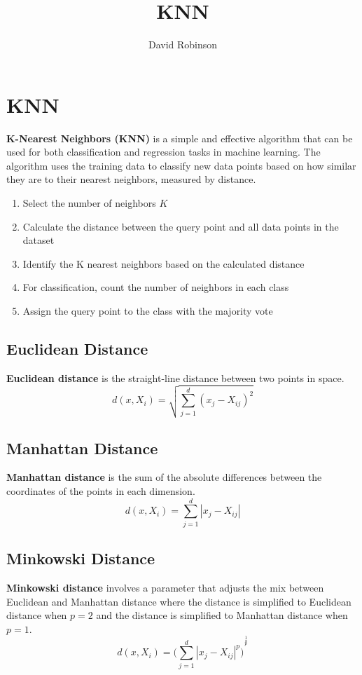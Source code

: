 \documentclass{article}
\title{KNN}
\author{David Robinson}
\date{}
\begin{document}
\maketitle

\section*{KNN}

\textbf{K-Nearest Neighbors (KNN)} is a simple and effective algorithm that can be used for both classification and regression tasks in machine learning. The algorithm uses the training data to classify new data points based on how similar they are to their nearest neighbors, measured by distance.

\begin{enumerate}
    \item Select the number of neighbors $K$
    \item Calculate the distance between the query point and all data points in the dataset
    \item Identify the K nearest neighbors based on the calculated distance
    \item For classification, count the number of neighbors in each class
    \item Assign the query point to the class with the majority vote
\end{enumerate}

\subsection*{Euclidean Distance}
\textbf{Euclidean distance} is the straight-line distance between two points in space.
\[d(x, X_i)=\sqrt{\sum_{j=1}^d{(x_j-X_{ij})}^2}\]

\subsection*{Manhattan Distance}
\textbf{Manhattan distance} is the sum of the absolute differences between the coordinates of the points in each dimension.
\[d(x, X_i)=\sum_{j=1}^d|x_j - X_{ij}|\]

\subsection*{Minkowski Distance}
\textbf{Minkowski distance} involves a parameter that adjusts the mix between Euclidean and Manhattan distance where the distance is simplified to Euclidean distance when $p=2$ and the distance is simplified to Manhattan distance when $p=1$.
\[d(x, X_i)={\Bigg(\sum_{j=1}^d {|x_j - X_{ij}|}^p\Bigg)}^\frac{1}{p}\]
\end{document}
